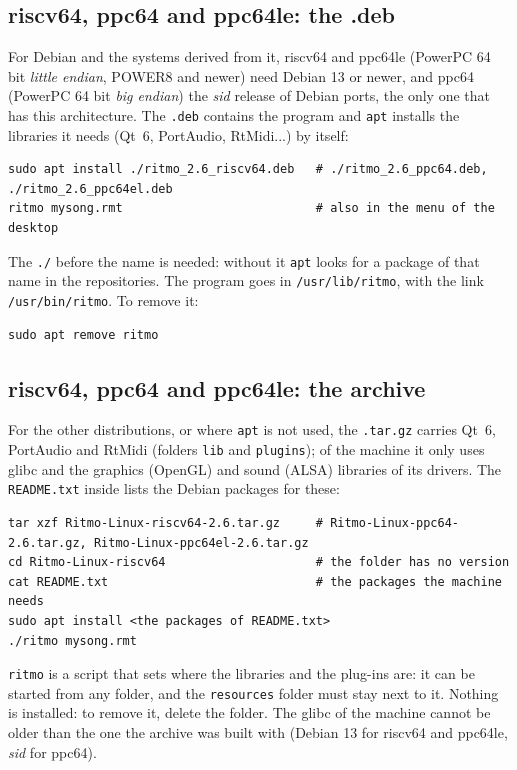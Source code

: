 \subsection{riscv64, ppc64 and ppc64le: the .deb}

For Debian and the systems derived from it, riscv64 and ppc64le (PowerPC 64 bit \emph{little endian}, POWER8 and newer) need
Debian 13 or newer, and ppc64 (PowerPC 64 bit \emph{big endian}) the \emph{sid} release of Debian ports, the only one that has
this architecture. The \texttt{.deb} contains the program and
\texttt{apt} installs the libraries it needs (Qt~6, PortAudio, RtMidi...) by itself:
\begin{lstlisting}
sudo apt install ./ritmo_2.6_riscv64.deb   # ./ritmo_2.6_ppc64.deb, ./ritmo_2.6_ppc64el.deb
ritmo mysong.rmt                           # also in the menu of the desktop
\end{lstlisting}
The \texttt{./} before the name is needed: without it \texttt{apt} looks for a package of that name in the repositories.
The program goes in \texttt{/usr/lib/ritmo}, with the link \texttt{/usr/bin/ritmo}. To remove it:
\begin{lstlisting}
sudo apt remove ritmo
\end{lstlisting}

\subsection{riscv64, ppc64 and ppc64le: the archive}

For the other distributions, or where \texttt{apt} is not used, the \texttt{.tar.gz} carries Qt~6, PortAudio and RtMidi (folders
\texttt{lib} and \texttt{plugins}); of the machine it only uses glibc and the graphics (OpenGL) and sound (ALSA) libraries of its
drivers. The \texttt{README.txt} inside lists the Debian packages for these:
\begin{lstlisting}
tar xzf Ritmo-Linux-riscv64-2.6.tar.gz     # Ritmo-Linux-ppc64-2.6.tar.gz, Ritmo-Linux-ppc64el-2.6.tar.gz
cd Ritmo-Linux-riscv64                     # the folder has no version
cat README.txt                             # the packages the machine needs
sudo apt install <the packages of README.txt>
./ritmo mysong.rmt
\end{lstlisting}
\texttt{ritmo} is a script that sets where the libraries and the plug-ins are: it can be started from any folder, and the
\texttt{resources} folder must stay next to it. Nothing is installed: to remove it, delete the folder. The glibc of the machine
cannot be older than the one the archive was built with (Debian 13 for riscv64 and ppc64le, \emph{sid} for ppc64).

